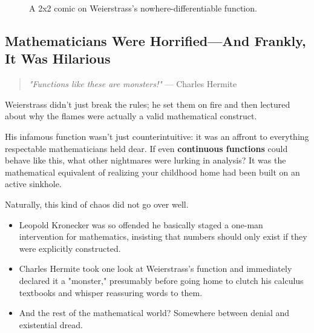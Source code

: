 \begin{figure}[H]
\centering
{}
\caption{A 2x2 comic on Weierstrass’s nowhere-differentiable function.}
\end{figure}


\subsection{Mathematicians Were Horrified—And Frankly, It Was Hilarious}

\begin{quote}
    \textit{"Functions like these are monsters!"} — Charles Hermite  
\end{quote}

Weierstrass didn’t just break the rules; he set them on fire and then lectured about why the flames were actually a valid mathematical construct.  

His infamous function wasn’t just counterintuitive: it was an affront to everything respectable mathematicians held dear. If even \textbf{continuous functions} could behave like this, what other nightmares were lurking in analysis? It was the mathematical equivalent of realizing your childhood home had been built on an active sinkhole.  

Naturally, this kind of chaos did not go over well.  

\begin{itemize}
    \item Leopold Kronecker was so offended he basically staged a one-man intervention for mathematics, insisting that numbers should only exist if they were explicitly constructed.  
    \item Charles Hermite took one look at Weierstrass’s function and immediately declared it a "monster," presumably before going home to clutch his calculus textbooks and whisper reassuring words to them.  
    \item And the rest of the mathematical world? Somewhere between denial and existential dread.  
\end{itemize}

